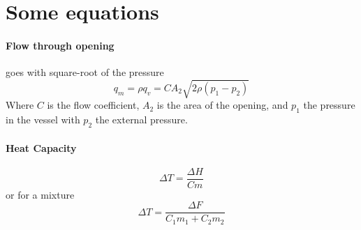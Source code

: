 \documentclass[12pt,a4paper]{article}
\begin{document}
\section{Some equations}
\paragraph{Flow through opening} goes with square-root of the pressure
\begin{equation}
	q_m = \rho q_v = C A_2 \sqrt{2\rho(p_1-p_2)}
\end{equation}
Where $C$ is the flow coefficient, $A_2$ is the area of the opening, 
and $p_1$ the pressure in the vessel with $p_2$ the external pressure.

\begin{table}
\end{table}

\paragraph{Heat Capacity}
\begin{equation}
	\Delta T = \frac{\Delta H}{Cm}
\end{equation}
or for a mixture
\begin{equation}
	\Delta T = \frac{\Delta F}{C_1 m_1 + C_2 m_2}
\end{equation}
\end{document}

